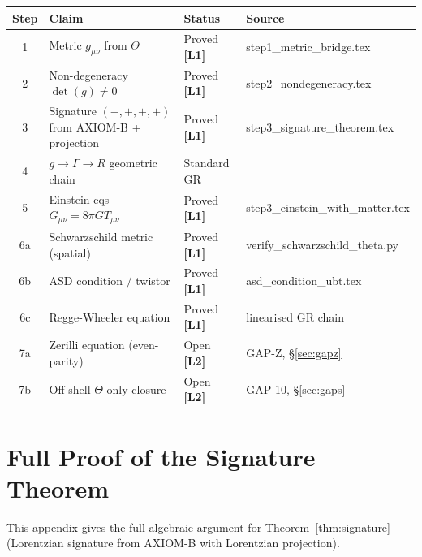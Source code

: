 \documentclass[12pt,a4paper]{article}
\theoremstyle{definition}
\theoremstyle{remark}
\newcommand{\Lone}{\textbf{[L1]}}
\newcommand{\Ltwo}{\textbf{[L2]}}
\begin{document}
\begin{tcolorbox}[colback=blue!3!white,colframe=blue!55!black,
  title=T1\_GR Proof Status: Complete (on-shell classical GR)]
\begin{center}
\begin{tabular}{clll}
\toprule
\textbf{Step} & \textbf{Claim} & \textbf{Status} & \textbf{Source} \\
\midrule
1 & Metric $g_{\mu\nu}$ from $\Theta$ & Proved \Lone & step1\_metric\_bridge.tex \\
2 & Non-degeneracy $\det(g)\neq 0$ & Proved \Lone & step2\_nondegeneracy.tex \\
3 & Signature $(-,+,+,+)$ from AXIOM-B + projection & Proved \Lone & step3\_signature\_theorem.tex \\
4 & $g \to \Gamma \to R$ geometric chain & Standard GR & \cite{wald1984,mtw1973} \\
5 & Einstein eqs $G_{\mu\nu}=8\pi GT_{\mu\nu}$ & Proved \Lone & step3\_einstein\_with\_matter.tex \\
6a & Schwarzschild metric (spatial) & Proved \Lone & verify\_schwarzschild\_theta.py \\
6b & ASD condition / twistor & Proved \Lone & asd\_condition\_ubt.tex \\
6c & Regge-Wheeler equation & Proved \Lone & linearised GR chain \\
7a & Zerilli equation (even-parity) & Open \Ltwo & GAP-Z, \S\ref{sec:gapz} \\
7b & Off-shell $\Theta$-only closure & Open \Ltwo & GAP-10, \S\ref{sec:gaps} \\
\bottomrule
\end{tabular}
\end{center}
\end{tcolorbox}

\appendix

\section{Full Proof of the Signature Theorem}
\label{app:signature}

This appendix gives the full algebraic argument for
Theorem~\ref{thm:signature} (Lorentzian signature from AXIOM-B with
Lorentzian projection).
\end{document}
